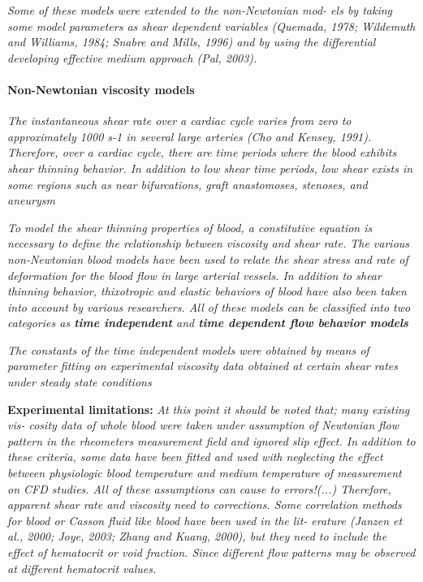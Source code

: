 \documentclass[11pt,letterpaper]{article}
\begin{document}
\textit{Some of these models  were  extended to  the non-Newtonian mod- els by taking some model  parameters as shear dependent variables 
(Quemada, 1978;  Wildemuth and Williams,
1984; Snabre and  Mills, 1996)  and by  using the differential developing effective medium approach (Pal, 2003).}

\paragraph{Non-Newtonian viscosity models}
\textit{The instantaneous shear  rate  over  a cardiac cycle  varies from zero to  approximately 1000 s-1 in several large arteries  (Cho  and Kensey,  1991). Therefore, over a  cardiac cycle, there are  time periods where the blood exhibits shear thinning  behavior. In addition  to low  shear time  periods, low shear exists in some  regions such as near bifurcations, graft anastomoses, stenoses, and  aneurysm}



\textit{To model the  shear thinning properties of blood, a constitutive  equation is necessary to  define the relationship between  viscosity  and shear rate. The various non-Newtonian blood models have been  used to relate  the shear stress  and rate of deformation for  the blood flow  in large arterial  vessels. In addition  to shear thinning behavior, thixotropic and  elastic behaviors of blood have also been  taken into account  by various researchers. All of  these models can be  classified  into two categories as \textbf{time  independent}  and \textbf{time dependent flow behavior  models}}

\textit{The constants of the time  independent models were obtained by means of parameter  fitting on  experimental viscosity  data obtained  at certain shear  rates under steady  state  conditions}

\textbf{Experimental limitations:}
\textit{At this point it should  be noted  that; many existing vis-
cosity  data of whole blood were taken under assumption of Newtonian flow pattern in  the rheometers measurement field and ignored slip  effect.  In  addition  to these criteria, some data  have been fitted and  used  with neglecting the effect between physiologic blood temperature and medium temperature  of  measurement on CFD studies. All of these assumptions can cause to  errors!(...) Therefore,  apparent  shear rate  and viscosity need to corrections. Some  correlation methods for blood or  Casson  fluid  like blood  have been used  in the lit- erature (Janzen  et al., 2000; Joye, 2003; Zhang and  Kuang, 2000), but  they need to include the  effect  of hematocrit  or void fraction. Since different flow patterns may be observed at different  hematocrit values.}
\end{document}
